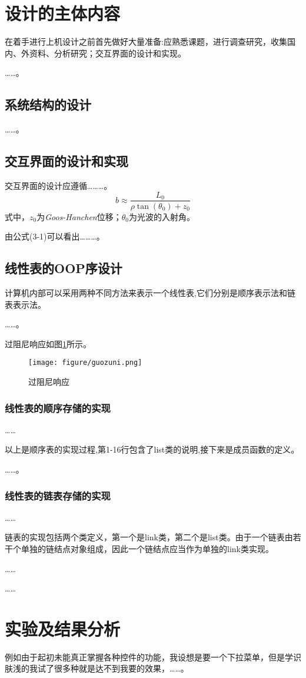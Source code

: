 \documentclass[supercite]{../upcthesis}
\begin{document}
\section{设计的主体内容}
在着手进行上机设计之前首先做好大量准备:应熟悉课题，进行调查研究，收集国内、外资料、分析研究；交互界面的设计和实现。

……。
\subsection{系统结构的设计}
……。
\subsection{交互界面的设计和实现}
交互界面的设计应遵循………。
\begin{equation}
        b\approx\frac{L_0}{\rho\tan(\theta_0)+z_0}
\end{equation}
式中，$z_0$为\textit{Goos-Hanchen}位移；$\theta_0$为光波的入射角。

由公式(3-1)可以看出………。
\subsection{线性表的OOP序设计}
计算机内部可以采用两种不同方法来表示一个线性表,它们分别是顺序表示法和链表表示法。

……。

过阻尼响应如图\ref{guozuni}所示。
\begin{figure}[htbp]
\centering

\texttt{[image: figure/guozuni.png]}
\caption{过阻尼响应}
\label{guozuni}
\end{figure}
\subsubsection{线性表的顺序存储的实现}
……

以上是顺序表的实现过程,第1-16行包含了list类的说明,接下来是成员函数的定义。

……。
\subsubsection{线性表的链表存储的实现}
……

链表的实现包括两个类定义，第一个是link类，第二个是list类。由于一个链表由若干个单独的链结点对象组成，因此一个链结点应当作为单独的link类实现。

……

……

\section{实验及结果分析}
例如由于起初未能真正掌握各种控件的功能，我设想是要一个下拉菜单，但是学识肤浅的我试了很多种就是达不到我要的效果，……。
\end{document}
